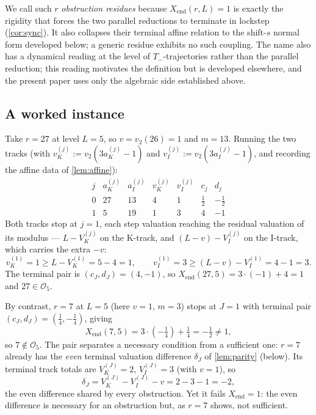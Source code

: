 \documentclass[11pt,reqno]{amsart}
\newcommand{\Tminus}{T_{-}}
\newcommand{\Obs}{\mathcal{O}}
\newcommand{\Xend}{X_{\mathrm{end}}}
\newcommand{\Vk}{V_{K}}
\newcommand{\Vi}{V_{I}}
\newcommand{\vk}{v_{K}}
\newcommand{\vi}{v_{I}}
\newcommand{\vtwo}{v_{2}}
\begin{document}
We call such $r$ \emph{obstruction residues} because $\Xend(r, L) = 1$ is
exactly the rigidity that forces the two parallel reductions to terminate in
lockstep (\cref{cor:sync}). It also collapses their terminal affine
relation to the shift-$s$ normal form developed below; a generic residue
exhibits no such coupling. The name also has a dynamical reading at the
level of $\Tminus$-trajectories rather than the parallel reduction; this
reading motivates the definition but is developed elsewhere, and the
present paper uses only the algebraic side established above.

\subsection{A worked instance}

\begin{example}[The reduction at $r = 27$, and a non-obstruction]
\label{ex:r27}
Take $r = 27$ at level $L = 5$, so $v = \vtwo(26) = 1$ and $m = 13$. Running
the two tracks (with $\vk^{(j)} := \vtwo(3 a_K^{(j)} - 1)$ and
$\vi^{(j)} := \vtwo(3 a_I^{(j)} - 1)$, and recording the affine data of
\cref{lem:affine}):
\[
\begin{array}{c|cc|cc|cc}
j & a_K^{(j)} & a_I^{(j)} & \vk^{(j)} & \vi^{(j)} & c_j & d_j \\
\hline
0 & 27 & 13 & 4 & 1 & \tfrac12 & -\tfrac12 \\
1 & 5  & 19 & 1 & 3 & 4         & -1
\end{array}
\]
Both tracks stop at $j = 1$, each step valuation reaching the residual
valuation of its modulus --- $L - \Vk^{(j)}$ on the K-track, and
$(L - v) - \Vi^{(j)}$ on the I-track, which carries the extra $-v$:
\[
\vk^{(1)} = 1 \ge L - \Vk^{(1)} = 5 - 4 = 1, \qquad
\vi^{(1)} = 3 \ge (L - v) - \Vi^{(1)} = 4 - 1 = 3.
\]
The terminal pair is
$(c_J, d_J) = (4, -1)$, so $\Xend(27, 5) = 3 \cdot (-1) + 4 = 1$ and
$27 \in \Obs_5$.

By contrast, $r = 7$ at $L = 5$ (here $v = 1$, $m = 3$) stops at $J = 1$ with
terminal pair $(c_J, d_J) = (\tfrac14, -\tfrac14)$, giving
\[
\Xend(7, 5) = 3 \cdot (-\tfrac14) + \tfrac14 = -\tfrac12 \ne 1,
\]
so $7 \notin \Obs_5$. The pair separates a necessary condition from a sufficient
one: $r = 7$ already has the \emph{even} terminal valuation difference $\delta_J$
of \cref{lem:parity} (below). Its terminal track totals are $\Vk^{(J)} = 2$,
$\Vi^{(J)} = 3$ (with $v = 1$), so
\[
\delta_J = \Vk^{(J)} - \Vi^{(J)} - v = 2 - 3 - 1 = -2,
\]
the even difference shared by every obstruction. Yet it fails $\Xend = 1$: the
even difference is necessary for an obstruction but, as $r = 7$ shows, not
sufficient.
\end{example}
\end{document}
